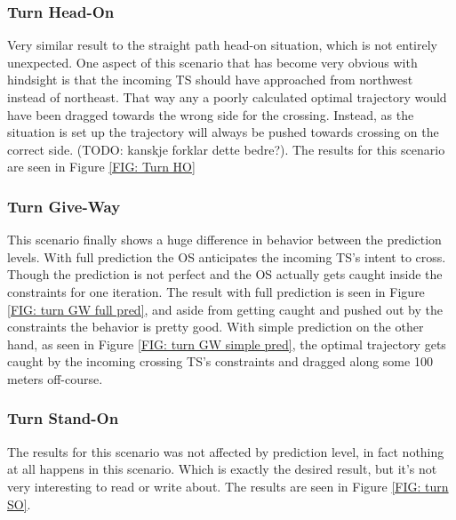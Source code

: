 \clearpage
\subsubsection{Turn Head-On}
Very similar result to the straight path head-on situation, which is not entirely unexpected. One aspect of this scenario that
has become very obvious with hindsight is that the incoming TS should have approached from northwest instead of northeast. That way
any a poorly calculated optimal trajectory would have been dragged towards the wrong side for the crossing. Instead, as the situation is set
up the trajectory will always be pushed towards crossing on the correct side. (TODO: kanskje forklar dette bedre?).
The results for this scenario are seen in Figure \ref{FIG: Turn HO}

\subsubsection{Turn Give-Way}
This scenario finally shows a huge difference in behavior between the prediction levels. With full prediction the OS
anticipates the incoming TS's intent to cross. Though the prediction is not perfect and the OS actually gets caught inside the
constraints for one iteration. The result with full prediction is seen in Figure \ref{FIG: turn GW full pred}, and aside from
getting caught and pushed out by the constraints the behavior is pretty good.
With simple prediction on the other hand, as seen in Figure \ref{FIG: turn GW simple pred}, the optimal trajectory gets caught by the
incoming crossing TS's constraints and dragged along some 100 meters off-course.

\subsubsection{Turn Stand-On}
The results for this scenario was not affected by prediction level, in fact nothing at all happens in this scenario. Which is exactly the desired result,
but it's not very interesting to read or write about. The results are seen in Figure \ref{FIG: turn SO}.

